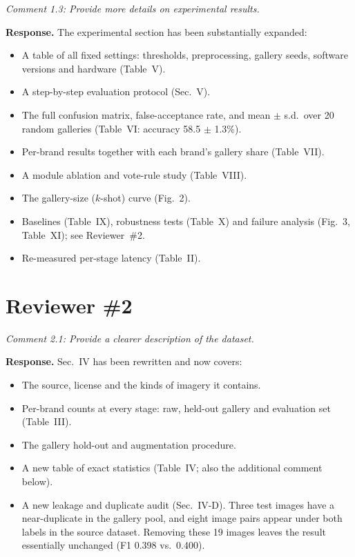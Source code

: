 \documentclass[10pt,a4paper]{article}
\newenvironment{comment}{\par\medskip\noindent\begin{minipage}{\linewidth}\color{black!70}\itshape}{\end{minipage}\par\smallskip}
\begin{document}
\begin{comment}Comment 1.3: Provide more details on experimental results.\end{comment}
\textbf{Response.} The experimental section has been substantially expanded:
\begin{itemize}[nosep,leftmargin=1.2em]
\item A table of all fixed settings: thresholds, preprocessing, gallery seeds, software versions and hardware (Table~V).
\item A step-by-step evaluation protocol (Sec.~V).
\item The full confusion matrix, false-acceptance rate, and mean $\pm$ s.d.\ over 20 random galleries (Table~VI: accuracy 58.5 $\pm$ 1.3\%).
\item Per-brand results together with each brand's gallery share (Table~VII).
\item A module ablation and vote-rule study (Table~VIII).
\item The gallery-size ($k$-shot) curve (Fig.~2).
\item Baselines (Table~IX), robustness tests (Table~X) and failure analysis (Fig.~3, Table~XI); see Reviewer~\#2.
\item Re-measured per-stage latency (Table~II).
\end{itemize}

\section*{Reviewer \#2}

\begin{comment}Comment 2.1: Provide a clearer description of the dataset.\end{comment}
\textbf{Response.} Sec.~IV has been rewritten and now covers:
\begin{itemize}[nosep,leftmargin=1.2em]
\item The source, license and the kinds of imagery it contains.
\item Per-brand counts at every stage: raw, held-out gallery and evaluation set (Table~III).
\item The gallery hold-out and augmentation procedure.
\item A new table of exact statistics (Table~IV; also the additional comment below).
\item A new leakage and duplicate audit (Sec.~IV-D). Three test images have a near-duplicate in the gallery pool, and eight image pairs appear under both labels in the source dataset. Removing these 19 images leaves the result essentially unchanged (F1 0.398 vs.\ 0.400).
\end{itemize}
\end{document}
